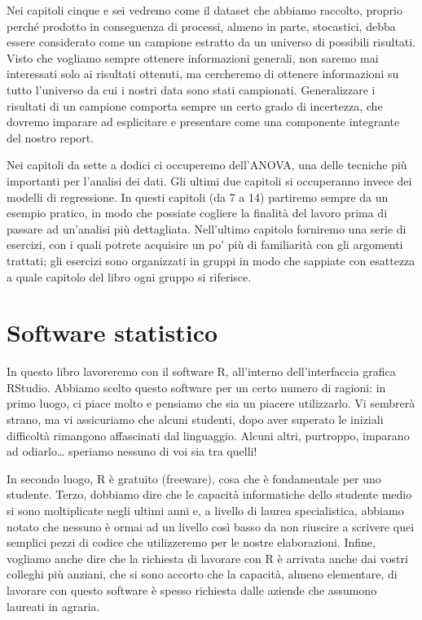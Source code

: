\documentclass[a4paper,12pt,oneside]{book}
\begin{document}
Nei capitoli cinque e sei vedremo come il dataset che abbiamo raccolto, proprio perché prodotto in conseguenza di processi, almeno in parte, stocastici, debba essere considerato come un campione estratto da un universo di possibili risultati. Visto che vogliamo sempre ottenere informazioni generali, non saremo mai interessati solo ai risultati ottenuti, ma cercheremo di ottenere informazioni su tutto l'universo da cui i nostri data sono stati campionati. Generalizzare i risultati di un campione comporta sempre un certo grado di incertezza, che dovremo imparare ad esplicitare e presentare come una componente integrante del nostro report.

Nei capitoli da sette a dodici ci occuperemo dell'ANOVA, una delle tecniche più importanti per l'analisi dei dati. Gli ultimi due capitoli si occuperanno invece dei modelli di regressione. In questi capitoli (da 7 a 14) partiremo sempre da un esempio pratico, in modo che possiate cogliere la finalità del lavoro prima di passare ad un'analisi più dettagliata. Nell'ultimo capitolo forniremo una serie di esercizi, con i quali potrete acquisire un po' più di familiarità con gli argomenti trattati; gli esercizi sono organizzati in gruppi in modo che sappiate con esattezza a quale capitolo del libro ogni gruppo si riferisce.

\hypertarget{software-statistico}{%
\section*{Software statistico}\label{software-statistico}}

In questo libro lavoreremo con il software R, all'interno dell'interfaccia grafica RStudio. Abbiamo scelto questo software per un certo numero di ragioni: in primo luogo, ci piace molto e pensiamo che sia un piacere utilizzarlo. Vi sembrerà strano, ma vi assicuriamo che alcuni studenti, dopo aver superato le iniziali difficoltà rimangono affascinati dal linguaggio. Alcuni altri, purtroppo, imparano ad odiarlo\ldots{} speriamo nessuno di voi sia tra quelli!

In secondo luogo, R è gratuito (freeware), cosa che è fondamentale per uno studente. Terzo, dobbiamo dire che le capacità informatiche dello studente medio si sono moltiplicate negli ultimi anni e, a livello di laurea specialistica, abbiamo notato che nessuno è ormai ad un livello così basso da non riuscire a scrivere quei semplici pezzi di codice che utilizzeremo per le nostre elaborazioni. Infine, vogliamo anche dire che la richiesta di lavorare con R è arrivata anche dai vostri colleghi più anziani, che si sono accorto che la capacità, almeno elementare, di lavorare con questo software è spesso richiesta dalle aziende che assumono laureati in agraria.
\end{document}
